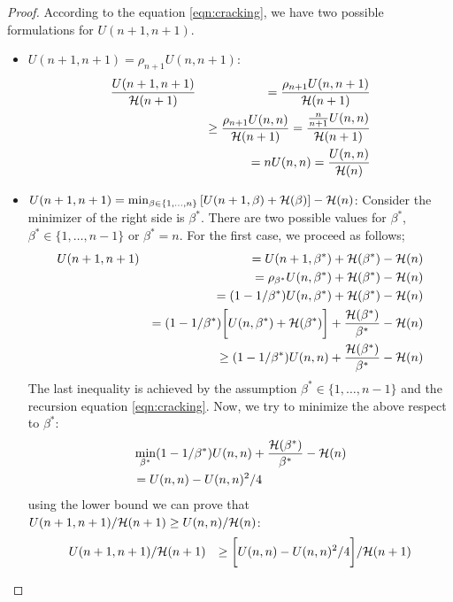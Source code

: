 \documentclass{article}
\newcommand{\bound}{{\cal H}}
\begin{document}
\begin{proof}
	According to the equation \ref{eqn:cracking}, we have two possible formulations
	for $U(n+1,n+1)$. 
	\begin{itemize}
	  \item $U(n+1,n+1)= \rho_{n+1} U(n,n+1)$:
	  \begin{eqnarray*}
	  	& \frac{U(n+1,n+1)}{\bound(n+1)} & = \frac{\rho_{n+1} U(n,n+1)}{\bound(n+1)}
	  	\\ 
	  	& & \geq \frac{\rho_{n+1} U(n,n)}{\bound(n+1)} = \frac{\frac{n}{n+1}
	  	U(n,n)}{\bound(n+1)} \\
	  	& & = n U(n,n)  = \frac{U(n,n)}{\bound(n)}
	  \end{eqnarray*}
	  \item $U(n+1,n+1) = \min_{\beta \in \{ 1,\ldots,n \}} \left[
	  U(n+1,\beta) + \bound(\beta) \right] - \bound(n)$:
	    Consider the minimizer of the right side is $\beta^*$. There are two
	    possible values for $\beta^*$, $\beta^* \in \{ 1,\ldots,n-1\}$ or $\beta^*
	    = n$.
	    For the first case, we proceed as follows; 
	    \begin{eqnarray*}
	    	& U(n+1,n+1) & = 
	  U(n+1,\beta^*) + \bound(\beta^*) -\bound(n) \\ 
	  		& & = \rho_{\beta^*}U(n,\beta^*) + \bound(\beta^*) -\bound(n) \\ 
	  		& & = (1-1/\beta^*)U(n,\beta^*) + \bound(\beta^*) -\bound(n) \\ 
	  		& & = (1-1/\beta^*)\bigg[ U(n,\beta^*) + \bound(\beta^*) \bigg] +
	  		\frac{\bound(\beta^*)}{\beta^*} - \bound(n) \\ 
	  		& & \geq (1-1/\beta^*) U(n,n) + \frac{\bound(\beta^*)}{\beta^*} - \bound(n) 
	    \end{eqnarray*}
	    The last inequality is achieved by the assumption $\beta^* \in \{
	    1,\ldots,n-1\}$ and the recursion equation \ref{eqn:cracking}. Now, we try
	    to minimize the above respect to $\beta^*$: 
	    \begin{eqnarray*}
	    	& \min_{\beta^*} (1-1/\beta^*) U(n,n) + \frac{\bound(\beta^*)}{\beta^*} -
	    	\bound(n) \\ 
	    	& = U(n,n) - U(n,n)^2/4
	    \end{eqnarray*}
	    using the lower bound we can prove that $U(n+1,n+1)/\bound(n+1) \geq
	    U(n,n)/\bound(n)$: 
	    \begin{eqnarray*}
	    	& U(n+1,n+1)/\bound(n+1) & \geq \bigg[U(n,n) -
	    	U(n,n)^2/4\bigg]/\bound(n+1)
	    	\\ 

\end{eqnarray*}
\end{itemize}
\end{proof}
\end{document}

